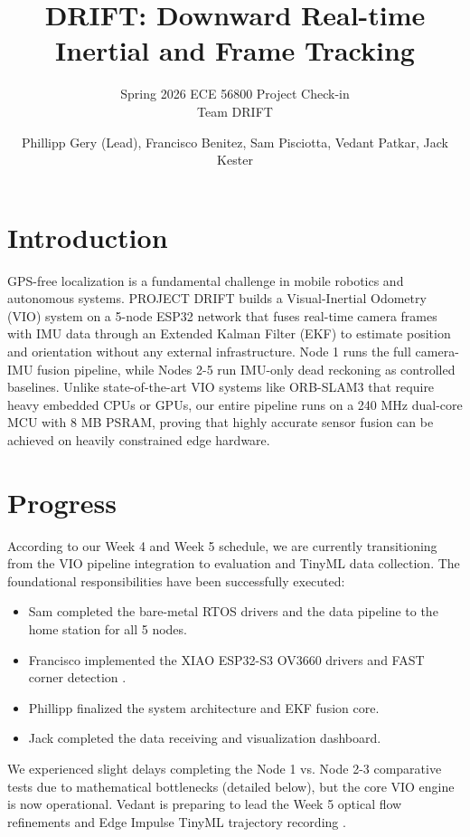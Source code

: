 \documentclass[sigconf,nonacm]{acmart}
\begin{document}
	
	\title{DRIFT: Downward Real-time Inertial and Frame Tracking}
	\subtitle{Spring 2026 ECE 56800 Project Check-in\\Team DRIFT}
	
	\author{Phillipp Gery (Lead), Francisco Benitez, Sam Pisciotta, Vedant Patkar, Jack Kester}
	
	\maketitle
	
	\section{Introduction}
	GPS-free localization is a fundamental challenge in mobile robotics and autonomous systems. PROJECT DRIFT builds a Visual-Inertial Odometry (VIO) system on a 5-node ESP32 network that fuses real-time camera frames with IMU data through an Extended Kalman Filter (EKF) \cite{welch2006kalman} to estimate position and orientation without any external infrastructure. Node 1 runs the full camera-IMU fusion pipeline, while Nodes 2-5 run IMU-only dead reckoning as controlled baselines. Unlike state-of-the-art VIO systems like ORB-SLAM3 \cite{campos2021orb} that require heavy embedded CPUs or GPUs, our entire pipeline runs on a 240 MHz dual-core MCU with 8 MB PSRAM, proving that highly accurate sensor fusion can be achieved on heavily constrained edge hardware.
	
	\section{Progress}
	According to our Week 4 and Week 5 schedule, we are currently transitioning from the VIO pipeline integration to evaluation and TinyML data collection. The foundational responsibilities have been successfully executed:
	\begin{itemize}
		\item Sam completed the bare-metal RTOS drivers and the data pipeline to the home station for all 5 nodes.
		\item Francisco implemented the XIAO ESP32-S3 OV3660 drivers and FAST corner detection \cite{rosten2010faster}.
		\item Phillipp finalized the system architecture and EKF fusion core.
		\item Jack completed the data receiving and visualization dashboard.
	\end{itemize}
	We experienced slight delays completing the Node 1 vs. Node 2-3 comparative tests due to mathematical bottlenecks (detailed below), but the core VIO engine is now operational. Vedant is preparing to lead the Week 5 optical flow refinements and Edge Impulse TinyML trajectory recording \cite{warden2019tinyml}.
	
\end{document}
